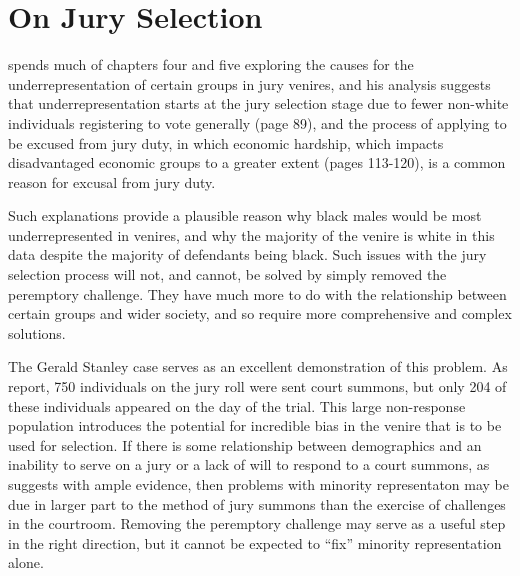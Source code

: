 \section{On Jury Selection}

\cite{vandykejurysel} spends much of chapters four and five exploring the causes for the underrepresentation of certain groups in
jury venires, and his analysis suggests that underrepresentation starts at the jury selection stage due to fewer non-white
individuals registering to vote generally (page 89), and the process of applying to be excused from jury duty, in which economic
hardship, which impacts disadvantaged economic groups to a greater extent (pages 113-120), is a common reason for excusal from
jury duty.

Such explanations provide a plausible reason why black males would be most underrepresented in venires, and why the majority of
the venire is white in this data despite the majority of defendants being black. Such issues with the jury selection process will
not, and cannot, be solved by simply removed the peremptory challenge. They have much more to do with the relationship between
certain groups and wider society, and so require more comprehensive and complex solutions.

The Gerald Stanley case serves as an excellent demonstration of this problem. As \cite{boushie750} report, 750 individuals on the
jury roll were sent court summons, but only 204 of these individuals appeared on the day of the trial. This large non-response
population introduces the potential for incredible bias in the venire that is to be used for selection. If there is some
relationship between demographics and an inability to serve on a jury or a lack of will to respond to a court summons, as
\cite{vandykejursel} suggests with ample evidence, then problems with minority representaton may be due in larger part to the
method of jury summons than the exercise of challenges in the courtroom. Removing the peremptory challenge may serve as a useful
step in the right direction, but it cannot be expected to ``fix'' minority representation alone.